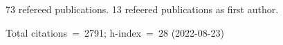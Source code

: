 73 refereed publications. 13 refeered publications as first author.

Total citations~=~2791; h-index~=~28 (2022-08-23)